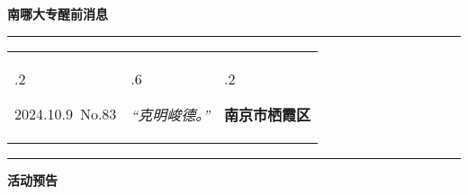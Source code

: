 \documentclass[letterpaper, 12pt]{article}
\begin{document}
\begin{center}
    \Huge\textbf{南哪大专醒前消息}
\end{center}
\vspace{4mm}
\hrule
\renewcommand\tabularxcolumn[1]{m{#1}}
\begin{tabularx}{\textwidth}{>{\hsize.2\hsize}X>{\hsize.6\hsize}X>{\hsize.2\hsize}X}
    \begin{flushleft}
        2024.10.9\, No.83
    \end{flushleft}
    &
    \begin{center}
        \textit{“克明峻德。”}
    \end{center}
    &
    \begin{flushright}
        \textbf{南京市栖霞区}
    \end{flushright}
\end{tabularx}
\vspace{-3.5mm}
\hrule
\vspace{4mm}
\centerline{\huge\textbf{活动预告}}
\end{document}
